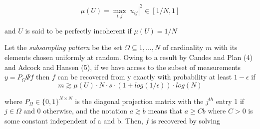 \documentclass{article}
\begin{document}
$$ \mu(U) = \max_{i,j}|u_{ij}|^2 \in [1/N,1]$$

and $U$ is said to be perfectly incoherent if $\mu(U) = 1/N $

Let the \textit{subsampling pattern} be the set $\Omega \subseteq {1,...,N}$ of cardinality $m$ with its elements chosen uniformly at random. Owing to a result by Candes and Plan (4) and Adcock and Hansen (5), if we have access to the subset of measurements $y = P_{\Omega} \Psi f$ then $f$ can be
recovered from y exactly with probability at least $1 - \epsilon$ if
$$m \gtrsim \mu(U ) \cdot N \cdot s \cdot (1 + log(1/\epsilon )) \cdot log(N)$$
 
where $P_{\Omega} \in \{0,1\}^{N \times N}$ is the diagonal projection matrix with the $j^{th}$ entry 1 if $j \in \Omega$ and 0 otherwise, and the notation $a \gtrsim b$ means that $a \geq Cb$ where $C>0$ is some constant independent of a and b. Then, $f$ is recovered by solving

\end{document}
